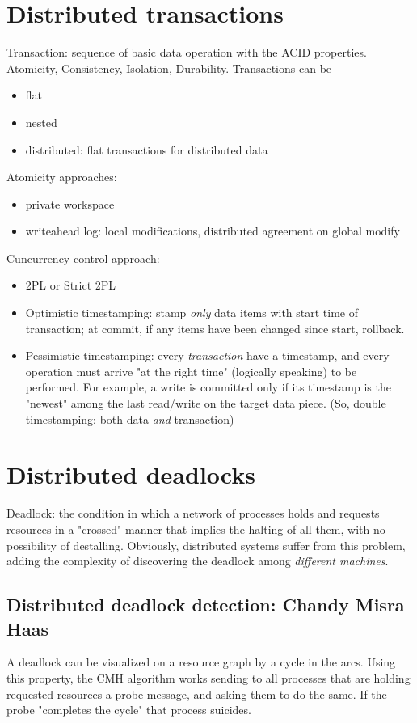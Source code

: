 \documentclass[10pt,a4paper]{article}
\begin{document}
		\section{Distributed transactions}
			Transaction: sequence of basic data operation with the ACID properties. Atomicity, Consistency, Isolation, Durability. Transactions can be
			\begin{itemize}
				\item flat
				\item nested
				\item distributed: flat transactions for distributed data
			\end{itemize}
			Atomicity approaches: 
			\begin{itemize}
				\item private workspace
				\item writeahead log: local modifications, distributed agreement on global modify
			\end{itemize}
			Cuncurrency control approach:
			\begin{itemize}
				\item 2PL or Strict 2PL
				\item Optimistic timestamping: stamp \emph{only} data items with start time of transaction; at commit, if any items have been changed since start, rollback.
				\item Pessimistic timestamping: every \emph{transaction} have a timestamp, and every operation must arrive "at the right time" (logically speaking) to be performed. For example, a write is committed only if its timestamp is the "newest" among the last read/write on the target data piece. (So, double timestamping: both data \emph{and} transaction)
			\end{itemize}
		
		\section{Distributed deadlocks}
			Deadlock: the condition in which a network of processes holds and requests resources in a "crossed" manner that implies the halting of all them, with no possibility of destalling. Obviously, distributed systems suffer from this problem, adding the complexity of discovering the deadlock among \emph{different machines}.\\
			
			\subsection{Distributed deadlock detection: Chandy Misra Haas}
				A deadlock can be visualized on a resource graph by a cycle in the arcs. Using this property, the CMH algorithm works sending to all processes that are holding requested resources a probe message, and asking them to do the same. If the probe "completes the cycle" that process suicides. 
			
\end{document}
